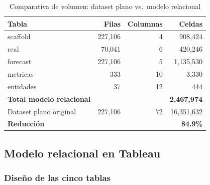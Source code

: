 \documentclass[12pt, letterpaper]{article}
\begin{document}
\begin{table}[H]
\centering
\caption{Comparativa de volumen: dataset plano vs.\ modelo relacional}
\label{tab:comparativa_dataset}
\small
\begin{tabularx}{\textwidth}{X r r r}
\toprule
\textbf{Tabla} & \textbf{Filas} & \textbf{Columnas} & \textbf{Celdas} \\
\midrule
scaffold   & 227,106 & 4  & 908,424 \\
real       & 70,041  & 6  & 420,246 \\
forecast   & 227,106 & 5  & 1,135,530 \\
metricas   & 333     & 10 & 3,330 \\
entidades  & 37      & 12 & 444 \\
\midrule
\textbf{Total modelo relacional} & & & \textbf{2,467,974} \\
\midrule
Dataset plano original & 227,106 & 72 & 16,351,632 \\
\textbf{Reducción} & & & \textbf{84.9\%} \\
\bottomrule
\end{tabularx}
\end{table}

\newpage
\subsection{Modelo relacional en Tableau}\label{subsec:modelo_relacional}

\subsubsection{Diseño de las cinco tablas}
\end{document}
